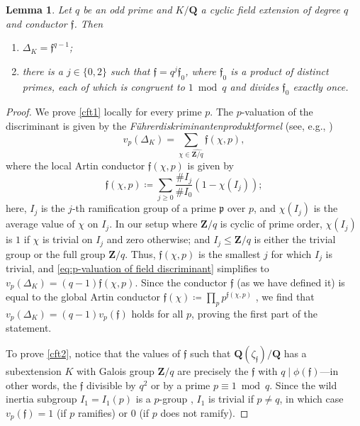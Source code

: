 \documentclass[12pt,reqno]{amsart}
\theoremstyle{definition}
\theoremstyle{plain}
\newtheorem{lemma}[theorem]{Lemma}
\theoremstyle{definition}
\newcommand{\mf}{\mathfrak}
\newcommand{\Z}{\mathbf{Z}}
\newcommand{\Q}{\mathbf{Q}}
\renewcommand{\geq}{\geqslant}
\renewcommand{\leq}{\leqslant}
\begin{document}
\begin{lemma}
\label{lem:class field theory}
Let $q$ be an odd prime and $K/\Q$ a cyclic field extension of degree $q$ and conductor $\mf{f}$. Then 
\begin{enumerate} \item \label{cft1} $\Delta_K = \mf{f}^{q-1}$;
\item \label{cft2} there is a $j \in \{0,2\}$ such that $\mf{f} = q^j \mf{f}_0$, where $\mf{f}_0$ is a product of distinct primes, each of which is congruent to $1 \bmod{q}$ and divides $\mf{f}_0$ exactly once.
\end{enumerate}
\end{lemma}
\begin{proof} We prove \eqref{cft1} locally for every prime $p$. The $p$-valuation of the discriminant is given by the \emph{F\"uhrerdiskriminantenproduktformel} (see, e.g., \cite[VI.4.3 \& VI.4.4]{CF})
\begin{equation}
\label{eq:p-valuation of field discriminant}
v_p(\Delta_K) = \sum_{\chi \in \widehat{\Z/q}} \mf{f}(\chi, p),
\end{equation}
where the local Artin conductor $\mf{f}(\chi, p)$ is given by 
\begin{equation}
\label{eq:local Artin conductor}
\mf{f}(\chi, p) \coloneqq  \sum_{j \geq 0} \frac{\#{I_j}}{\#{I_0}} (1 - \chi(I_j));
\end{equation}
here, $I_j$ is the $j$-th ramification group of a prime $\mf{p}$ over $p$, and $\chi(I_j)$ is the average value of $\chi$ on $I_j$. In our setup where $\Z/q$ is cyclic of prime order, $\chi(I_j)$ is $1$ if $\chi$ is trivial on $I_j$ and zero otherwise; and $I_j \leq \Z/q$ is either the trivial group or the full group $\Z/q$. Thus, $\mf{f}(\chi, p)$ is the smallest $j$ for which $I_j$ is trivial, and \eqref{eq:p-valuation of field discriminant} simplifies to $v_p(\Delta_K) = (q-1)\mf{f}(\chi, p)$. Since the conductor $\mf{f}$ (as we have defined it) is equal to the global Artin conductor $\mf{f}(\chi) \coloneqq  \prod_p p^{\mf{f}(\chi, p)}$ \cite[Chapter~VI.6]{Neukirch}, we find that $v_p(\Delta_K) = (q-1)v_p(\mf{f})$ holds for all $p$, proving the first part of the statement.

To prove \eqref{cft2}, notice that the values of $\mf{f}$ such that $\Q(\zeta_\mf{f})/\Q$ has a subextension $K$ with Galois group $\Z/q$ are precisely the $\mf{f}$ with $q \mid \phi(\mf{f})$---in other words, the $\mf{f}$ divisible by $q^2$ or by a prime $p \equiv 1 \bmod{q}$. Since the wild inertia subgroup $I_1 = I_1(p)$ is a $p$-group \cite[I.8, Theorem~1(ii)]{CF}, $I_1$ is trivial if $p \neq q$, in which case $v_p(\mf{f}) = 1$ (if $p$ ramifies) or $0$ (if $p$ does not ramify).


\end{proof}
\end{document}
